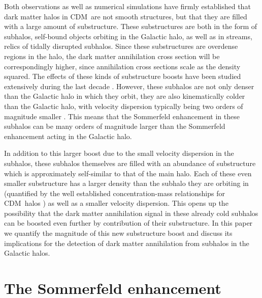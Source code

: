\documentclass[aps,prd,twocolumn,amsmath,amssymb,floatfix,nofootinbib,10pt]{revtex4}
\newcommand{\CDM}{CDM}
\begin{document}
Both observations
\cite{1994Natur.370..194I,1999Natur.402...53H,2005ApJ...626L..85W,2007ApJ...654..897B,koposov}
as well as numerical simulations
\cite{1998MNRAS.300..146G,johnston98a,1999ApJ...524L..19M,1999ApJ...522...82K,1999MNRAS.307..495H,2003MNRAS.339..834H,2008Natur.454..735D,2008MNRAS.391.1685S}
have firmly established that dark matter halos in \CDM\ are not smooth
structures, but that they are filled with a large amount of
substructure. These substructures are both in the form of subhalos,
self-bound objects orbiting in the Galactic halo, as well as in
streams, relics of tidally disrupted subhalos. Since these
substructures are overdense regions in the halo, the dark matter
annihilation cross section will be correspondingly higher, since
annihilation cross sections scale as the density squared. The effects
of these kinds of substructure boosts have been studied extensively
during the last decade
\cite{2004PhRvD..70b3512B,2004PhRvD..69d3501K,2007ApJ...657..262D,2007PhRvD..75h3526S,2008A&A...479..427L,2008MNRAS.384.1627P,2008ApJ...678..614S,2008ApJ...686..262K,2008Natur.456...73S,2008arXiv0809.2781G}. However,
these subhalos are not only denser than the Galactic halo in which
they orbit, they are also kinematically colder than the Galactic halo,
with velocity dispersion typically being two orders of magnitude
smaller \cite{1998ARA&A..36..435M,2007ApJ...670..313S}. This means
that the Sommerfeld enhancement in these subhalos can be many orders
of magnitude larger than the Sommerfeld enhancement acting in the
Galactic halo. 

In addition to this larger boost due to the small
velocity dispersion in the subhalos, these subhalos themselves are
filled with an abundance of substructure which is approximately
self-similar to that of the main halo. Each of these even smaller
substructure has a larger density than the subhalo they are orbiting
in (quantified by the well established concentration-mass
relationships for \CDM\ halos
\cite{2001MNRAS.321..559B,2001ApJ...554..114E}) as well as a smaller
velocity dispersion. This opens up the possibility that the dark
matter annihilation signal in these already cold subhalos can be
boosted even further by contribution of their substructure. In this
paper we quantify the magnitude of this new substructure boost and
discuss its implications for the detection of dark matter annihilation
from subhalos in the Galactic halos.




\section{The Sommerfeld enhancement}
\end{document}
